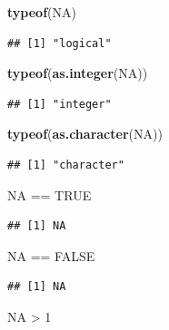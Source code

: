 \documentclass[twoside,symmetric]{book}
\newenvironment{Shaded}{}{}
\newcommand{\DecValTok}[1]{#1}
\newcommand{\KeywordTok}[1]{\textbf{#1}}
\newcommand{\NormalTok}[1]{#1}
\newcommand{\OperatorTok}[1]{#1}
\newcommand{\OtherTok}[1]{#1}
\newcommand{\StringTok}[1]{#1}
\begin{document}
\begin{Shaded}
\begin{Highlighting}[]
\KeywordTok{typeof}\NormalTok{(}\OtherTok{NA}\NormalTok{)}
\end{Highlighting}
\end{Shaded}

\begin{verbatim}
## [1] "logical"
\end{verbatim}

\begin{Shaded}
\begin{Highlighting}[]
\KeywordTok{typeof}\NormalTok{(}\KeywordTok{as.integer}\NormalTok{(}\OtherTok{NA}\NormalTok{))}
\end{Highlighting}
\end{Shaded}

\begin{verbatim}
## [1] "integer"
\end{verbatim}

\begin{Shaded}
\begin{Highlighting}[]
\KeywordTok{typeof}\NormalTok{(}\KeywordTok{as.character}\NormalTok{(}\OtherTok{NA}\NormalTok{))}
\end{Highlighting}
\end{Shaded}

\begin{verbatim}
## [1] "character"
\end{verbatim}

\begin{Shaded}
\begin{Highlighting}[]
\OtherTok{NA} \OperatorTok{==}\StringTok{ }\OtherTok{TRUE}
\end{Highlighting}
\end{Shaded}

\begin{verbatim}
## [1] NA
\end{verbatim}

\begin{Shaded}
\begin{Highlighting}[]
\OtherTok{NA} \OperatorTok{==}\StringTok{ }\OtherTok{FALSE}
\end{Highlighting}
\end{Shaded}

\begin{verbatim}
## [1] NA
\end{verbatim}

\begin{Shaded}
\begin{Highlighting}[]
\OtherTok{NA} \OperatorTok{>}\StringTok{ }\DecValTok{1}
\end{Highlighting}
\end{Shaded}
\end{document}
